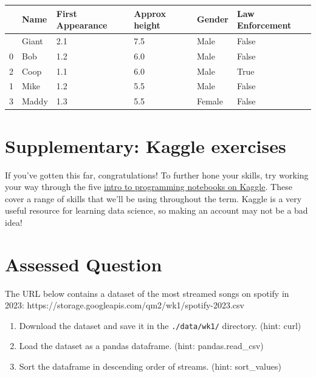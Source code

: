 \documentclass[
  letterpaper,
  DIV=11,
  numbers=noendperiod]{scrreprt}
\providecommand{\tightlist}{%
  \setlength{\itemsep}{0pt}\setlength{\parskip}{0pt}}\usepackage{longtable,booktabs,array}
\begin{document}
\begin{longtable}[]{@{}llllll@{}}
\toprule\noalign{}
& Name & First Appearance & Approx height & Gender & Law Enforcement \\
\midrule\noalign{}
\endhead
\bottomrule\noalign{}
\endlastfoot
4 & Giant & 2.1 & 7.5 & Male & False \\
0 & Bob & 1.2 & 6.0 & Male & False \\
2 & Coop & 1.1 & 6.0 & Male & True \\
1 & Mike & 1.2 & 5.5 & Male & False \\
3 & Maddy & 1.3 & 5.5 & Female & False \\
\end{longtable}


\hypertarget{supplementary-kaggle-exercises}{%
\chapter{Supplementary: Kaggle
exercises}\label{supplementary-kaggle-exercises}}

If you've gotten this far, congratulations! To further hone your skills,
try working your way through the five
\href{https://www.kaggle.com/learn/intro-to-programming}{intro to
programming notebooks on Kaggle}. These cover a range of skills that
we'll be using throughout the term. Kaggle is a very useful resource for
learning data science, so making an account may not be a bad idea!


\hypertarget{assessed-question}{%
\chapter{Assessed Question}\label{assessed-question}}

The URL below contains a dataset of the most streamed songs on spotify
in 2023: https://storage.googleapis.com/qm2/wk1/spotify-2023.csv

\begin{enumerate}
\def\labelenumi{\arabic{enumi}.}
\tightlist
\item
  Download the dataset and save it in the \texttt{./data/wk1/}
  directory. (hint: curl)
\item
  Load the dataset as a pandas dataframe. (hint: pandas.read\_csv)
\item
  Sort the dataframe in descending order of streams. (hint:
  sort\_values)
\end{enumerate}
\end{document}
